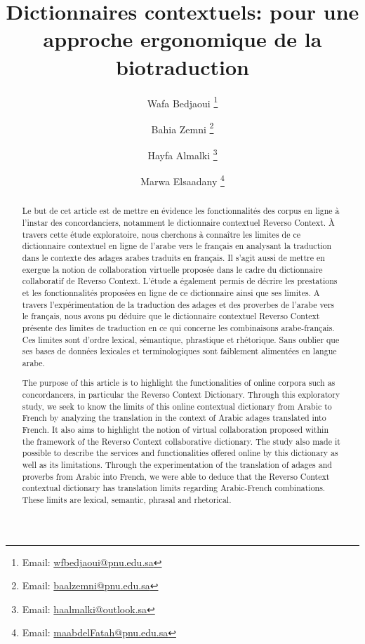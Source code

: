 \documentclass[french]{textolivre}
\title{Dictionnaires contextuels: pour une approche ergonomique de la biotraduction}
\author[1]{Wafa Bedjaoui \orcid{0000-0002-0660-8418} \thanks{Email: \url{wfbedjaoui@pnu.edu.sa}}}
\author[1]{Bahia Zemni \orcid{orcid.org/0000-0002-6238-7509} \thanks{Email: \url{baalzemni@pnu.edu.sa}}}
\author[1]{Hayfa Almalki \thanks{Email: \url{haalmalki@outlook.sa}}}
\author[1]{Marwa Elsaadany \orcid{0000-0002-6867-4250} \thanks{Email: \url{maabdelFatah@pnu.edu.sa}}}
\affil[1]{Princess Nourah bint Abdulrahman University, Riyadh, Arabie Saoudite.}
\begin{document}
\maketitle

\begin{polyabstract}
\begin{abstract}
Le but de cet article est de mettre en évidence les fonctionnalités des corpus en ligne à l'instar des concordanciers, 
notamment le dictionnaire contextuel Reverso Context. À travers cette étude exploratoire, nous cherchons à connaître les limites 
de ce dictionnaire contextuel en ligne de l'arabe vers le français en analysant la traduction dans le contexte des adages arabes 
traduits en français. Il s'agit aussi de mettre en exergue la notion de collaboration virtuelle proposée dans le cadre du 
dictionnaire collaboratif de Reverso Context. L'étude a également permis de décrire les prestations et les fonctionnalités 
proposées en ligne de ce dictionnaire ainsi que ses limites. A travers l'expérimentation de la traduction des adages et des 
proverbes de l'arabe vers le français, nous avons pu déduire que le dictionnaire contextuel Reverso Context présente des limites 
de traduction en ce qui concerne les combinaisons arabe-français. Ces limites sont d’ordre lexical, sémantique, phrastique et 
rhétorique. Sans oublier que ses bases de données lexicales et terminologiques sont faiblement alimentées en langue arabe.

\end{abstract}

\begin{english}
\begin{abstract}
The purpose of this article is to highlight the functionalities of online corpora such as concordancers, 
in particular the Reverso Context Dictionary. Through this exploratory study, we seek to know the limits 
of this online contextual dictionary from Arabic to French by analyzing the translation in the context of 
Arabic adages translated into French. It also aims to highlight the notion of virtual collaboration proposed 
within the framework of the Reverso Context collaborative dictionary. The study also made it possible to 
describe the services and functionalities offered online by this dictionary as well as its limitations. 
Through the experimentation of the translation of adages and proverbs from Arabic into French, we were able 
to deduce that the Reverso Context contextual dictionary has translation limits regarding Arabic-French 
combinations. These limits are lexical, semantic, phrasal and rhetorical.


\end{abstract}
\end{english}
\end{polyabstract}
\end{document}

